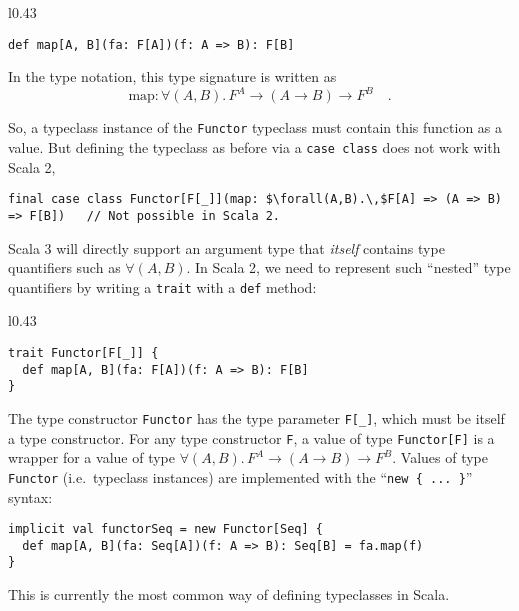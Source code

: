 \begin{wrapfigure}{l}{0.43\columnwidth}%
\vspace{-0.75\baselineskip}
\begin{lstlisting}
def map[A, B](fa: F[A])(f: A => B): F[B]
\end{lstlisting}
\vspace{-0.05\baselineskip}
\end{wrapfigure}%

\noindent In the type notation, this type signature is written as\vspace{-0.45\baselineskip}
\[
\text{map}:\forall(A,B).\,F^{A}\rightarrow\left(A\rightarrow B\right)\rightarrow F^{B}\quad.
\]
\vspace{-1.5\baselineskip}

\noindent So, a typeclass instance of the \lstinline!Functor! typeclass
must contain this function as a value. But defining the typeclass
as before via a \lstinline!case class! does not work with Scala 2,
\begin{lstlisting}[mathescape=true]
final case class Functor[F[_]](map: $\forall(A,B).\,$F[A] => (A => B) => F[B])   // Not possible in Scala 2.
\end{lstlisting}
Scala 3 will directly support an argument type that \emph{itself}
contains type quantifiers such as $\forall(A,B)$. In Scala 2, we
need to represent such ``nested'' type quantifiers by writing a
\lstinline!trait! with a \lstinline!def! method:

\begin{wrapfigure}{l}{0.43\columnwidth}%
\vspace{-0.75\baselineskip}
\begin{lstlisting}
trait Functor[F[_]] {
  def map[A, B](fa: F[A])(f: A => B): F[B]
}
\end{lstlisting}
\vspace{-0.75\baselineskip}
\end{wrapfigure}%

\noindent The type constructor \lstinline!Functor! has the type parameter
\lstinline!F[_]!, which must be itself a type constructor. For any
type constructor \lstinline!F!, a value of type \lstinline!Functor[F]!
is a wrapper for a value of type $\forall(A,B).\,F^{A}\rightarrow\left(A\rightarrow B\right)\rightarrow F^{B}$.
Values of type \lstinline!Functor! (i.e.~typeclass instances) are
implemented with the ``\lstinline!new { ... }!'' syntax:
\begin{lstlisting}
implicit val functorSeq = new Functor[Seq] {
  def map[A, B](fa: Seq[A])(f: A => B): Seq[B] = fa.map(f)
}
\end{lstlisting}
This is currently the most common way of defining typeclasses in Scala.

